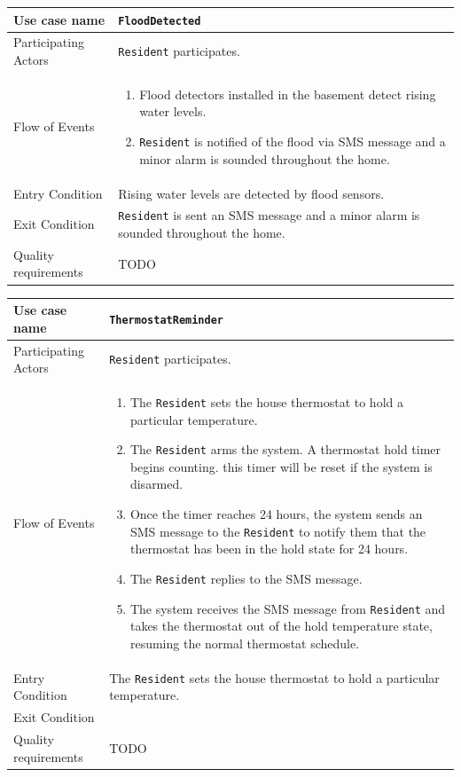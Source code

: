 \documentclass{report}
\begin{document}
\begin{tabular}{| l | p{12cm} |}
\hline
Use case name & \texttt{FloodDetected} \\ \hline
Participating Actors & \texttt{Resident} participates. \\ \hline
Flow of Events & 

\begin{enumerate}
 \item Flood detectors installed in the basement detect rising water levels.
 \item \texttt{Resident} is notified of the flood via SMS message and a minor alarm
       is sounded throughout the home.
\end{enumerate}

\\ \hline

Entry Condition & Rising water levels are detected by flood sensors. \\ \hline
Exit Condition & \texttt{Resident} is sent an SMS message and a minor alarm
                 is sounded throughout the home. \\ \hline
Quality requirements & TODO \\ \hline

\hline
\end{tabular}

\begin{tabular}{| l | p{12cm} |}
\hline
Use case name & \texttt{ThermostatReminder} \\ \hline
Participating Actors & \texttt{Resident} participates. \\ \hline
Flow of Events & 

\begin{enumerate}
 \item The \texttt{Resident} sets the house thermostat to hold a particular temperature.
 \item The \texttt{Resident} arms the system. A thermostat hold timer begins counting.
       this timer will be reset if the system is disarmed.
 \item Once the timer reaches 24 hours, the system sends an SMS message to the \texttt{Resident}
       to notify them that the thermostat has been in the hold state for 24 hours.
 \item The \texttt{Resident} replies to the SMS message.
 \item The system receives the SMS message from \texttt{Resident} and takes the thermostat
       out of the hold temperature state, resuming the normal thermostat schedule.
\end{enumerate}

\\ \hline

Entry Condition & The \texttt{Resident} sets the house thermostat to hold a particular
                  temperature. \\ \hline
Exit Condition &   \\ \hline
Quality requirements & TODO \\ \hline

\hline
\end{tabular}
\end{document}
